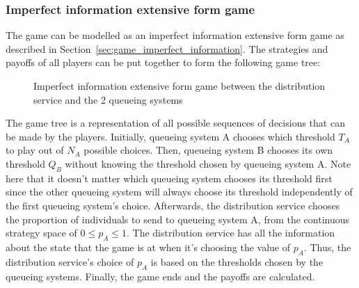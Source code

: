 \subsubsection{Imperfect information extensive form game}

The game can be modelled as an imperfect information extensive form game as
described in Section~\ref{sec:game_imperfect_information}.
The strategies and payoffs of all players can be put together to form the
following game tree:

\begin{figure}[H]
    \centering
    
    \caption{Imperfect information extensive form game between the distribution
    service and the 2 queueing systems}
    \label{fig:imperfect_info_game}
\end{figure}

The game tree is a representation of all possible sequences of decisions that
can be made by the players.
Initially, queueing system A chooses which threshold \(T_A\) to play out of
\(N_A\) possible choices.
Then, queueing system B chooses its own threshold \(Q_B\) without knowing the
threshold chosen by queueing system A.
Note here that it doesn't matter which queueing system chooses its threshold
first since the other queueing system will always choose its threshold
independently of the first queueing system's choice.
Afterwards, the distribution service chooses the proportion of individuals to
send to queueing system A, from the continuous strategy space of \(0 \leq p_A
\leq 1\).
The distribution service has all the information about the state that the game
is at when it's choosing the value of \(p_A\).
Thus, the distribution service's choice of \(p_A\) is based on the thresholds
chosen by the queueing systems.
Finally, the game ends and the payoffs are calculated.
